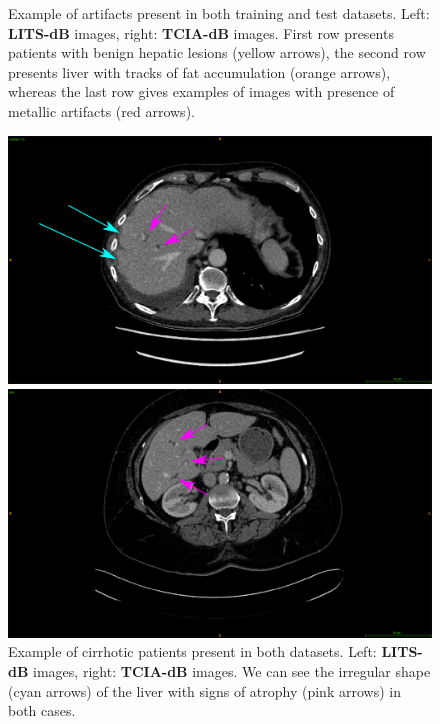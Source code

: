 \documentclass[]{article}
\newcommand{\lmttfont}[1]{{\fontfamily{lmtt}\selectfont #1}}
\begin{document}
\begin{figure}[!ht]
\begin{minipage}{0.45\linewidth}
	\end{minipage}
	\caption{Example of artifacts present in both training and test datasets. Left: \textbf{\lmttfont{LITS-dB}} images, right: \textbf{\lmttfont{TCIA-dB}} images. First row presents patients with benign hepatic lesions (yellow arrows), the second row presents liver with tracks of fat accumulation (orange arrows), whereas the last row gives examples of images with presence of metallic artifacts (red arrows).}
	\label{fig:InterDb_artifacts}
\end{figure}
\begin{figure}[!ht]
	\centering
	\begin{minipage}{0.45\linewidth}
		\includegraphics[width=\linewidth]{../Contributions/images/ResizeLITS_cirrhoticPatientArrows}
	\end{minipage} \hspace{-0.1cm}
	\begin{minipage}{0.45\linewidth}
		\includegraphics[width=\linewidth]{../Contributions/images/ResizeTCIA_cirrhoticPatientArrows}
	\end{minipage}
	\caption{Example of cirrhotic patients present in both datasets.  Left: \textbf{\lmttfont{LITS-dB}} images, right: \textbf{\lmttfont{TCIA-dB}} images. We can see the irregular shape (cyan arrows) of the liver with signs of atrophy (pink arrows) in both cases.}
	\label{fig:InterDb_diseasedLivers}
\end{figure}
\end{document}
